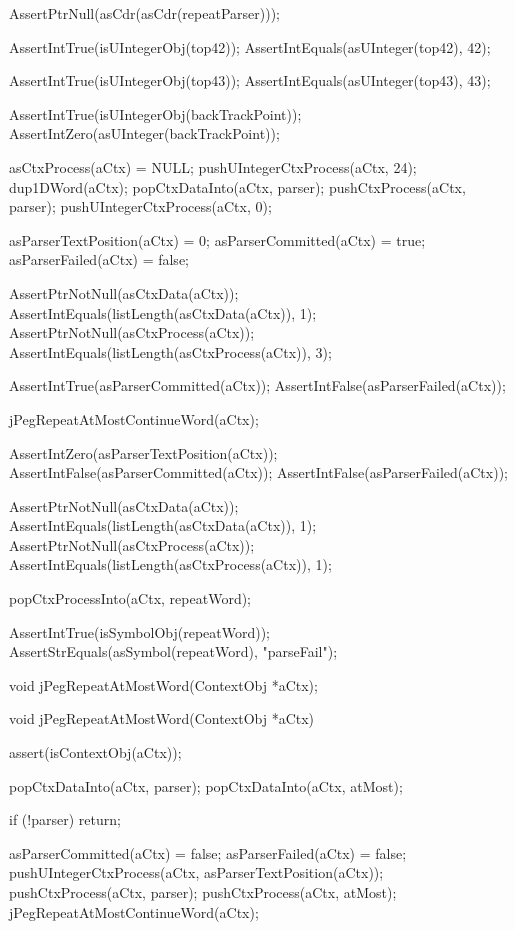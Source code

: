   AssertPtrNull(asCdr(asCdr(repeatParser)));
  
  AssertIntTrue(isUIntegerObj(top42));
  AssertIntEquals(asUInteger(top42), 42);  

  AssertIntTrue(isUIntegerObj(top43));
  AssertIntEquals(asUInteger(top43), 43);
  
  AssertIntTrue(isUIntegerObj(backTrackPoint));
  AssertIntZero(asUInteger(backTrackPoint));
\stopCTest
\stopTestCase

\startCTest
  asCtxProcess(aCtx) = NULL;
  pushUIntegerCtxProcess(aCtx, 24);
  dup1DWord(aCtx);
  popCtxDataInto(aCtx, parser);
  pushCtxProcess(aCtx, parser);
  pushUIntegerCtxProcess(aCtx, 0);

  asParserTextPosition(aCtx) = 0;
  asParserCommitted(aCtx)    = true;
  asParserFailed(aCtx)       = false;
  
  AssertPtrNotNull(asCtxData(aCtx));
  AssertIntEquals(listLength(asCtxData(aCtx)), 1);
  AssertPtrNotNull(asCtxProcess(aCtx));
  AssertIntEquals(listLength(asCtxProcess(aCtx)), 3);
  
  AssertIntTrue(asParserCommitted(aCtx));
  AssertIntFalse(asParserFailed(aCtx));
  
  jPegRepeatAtMostContinueWord(aCtx);
  
  AssertIntZero(asParserTextPosition(aCtx));
  AssertIntFalse(asParserCommitted(aCtx));
  AssertIntFalse(asParserFailed(aCtx));
  
  AssertPtrNotNull(asCtxData(aCtx));
  AssertIntEquals(listLength(asCtxData(aCtx)), 1);
  AssertPtrNotNull(asCtxProcess(aCtx));
  AssertIntEquals(listLength(asCtxProcess(aCtx)), 1);
    
  popCtxProcessInto(aCtx, repeatWord);
  
  AssertIntTrue(isSymbolObj(repeatWord));
  AssertStrEquals(asSymbol(repeatWord), "parseFail");
\stopCTest
\stopTestCase
\stopTestSuite

\startTestSuite[jPegRepeatAtMostWord]

\startCHeader
void jPegRepeatAtMostWord(ContextObj *aCtx);
\stopCHeader

\startCCode
void jPegRepeatAtMostWord(ContextObj *aCtx) {
  assert(isContextObj(aCtx));
  
  popCtxDataInto(aCtx, parser);
  popCtxDataInto(aCtx, atMost);
  
  if (!parser) return;
  
  asParserCommitted(aCtx) = false;
  asParserFailed(aCtx)    = false;
  pushUIntegerCtxProcess(aCtx, asParserTextPosition(aCtx));
  pushCtxProcess(aCtx, parser);
  pushCtxProcess(aCtx, atMost);
  jPegRepeatAtMostContinueWord(aCtx);
}
\stopCCode


